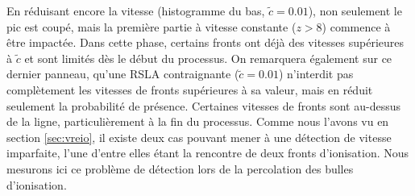 En réduisant encore la vitesse (histogramme du bas, $\tilde{c}=0.01$), non seulement le pic est coupé, mais la première partie à vitesse constante ($z>8$) commence à être impactée.
Dans cette phase, certains fronts ont déjà des vitesses supérieures à $\tilde{c}$ et sont limités dès le début du processus.
On remarquera également sur ce dernier panneau, qu'une \ac{RSLA} contraignante ($\tilde{c}=0.01$) n'interdit pas complètement les vitesses de fronts supérieures à sa valeur, mais en réduit seulement la probabilité de présence.
Certaines vitesses de fronts sont au-dessus de la ligne, particulièrement à la fin du processus.
Comme nous l'avons vu en section \ref{sec:vreio}, il existe deux cas pouvant mener à une détection de vitesse imparfaite, l'une d'entre elles étant la rencontre de deux fronts d'ionisation.
Nous mesurons ici ce problème de détection lors de la percolation des bulles d'ionisation.


%


